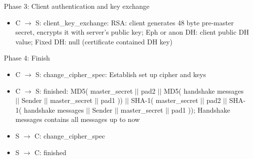 \documentclass[english, leagacyboxes, nologo]{latex4ei/latex4ei_sheet}
\begin{document}
{  Phase 3:  Client  authentication and key exchange
  \begin{itemize}
  \item C $\rightarrow$ S: client\_key\_exchange: RSA: client generates 48  byte pre-master  secret, encrypts it  with server’s
  public  key; Eph or  anon DH: client  public  DH  value; Fixed DH: null (certificate contained DH  key)
  \end{itemize}

  Phase 4: Finish
  \begin{itemize}
  \item C $\rightarrow$ S: change\_cipher\_spec: Establish set up cipher and keys
  \item C $\rightarrow$ S: finished: MD5( master\_secret $||$ pad2 $||$ MD5( handshake messages $||$ Sender $||$ master\_secret $||$ pad1 )) $||$ SHA-1( master\_secret $||$ pad2 $||$ SHA-1( handshake messages $||$ Sender $||$ master\_secret $||$ pad1 )); Handshake messages contains all messages up to now
  \item S $\rightarrow$ C: change\_cipher\_spec
  \item S $\rightarrow$ C: finished
  \end{itemize}
  }
\end{document}
